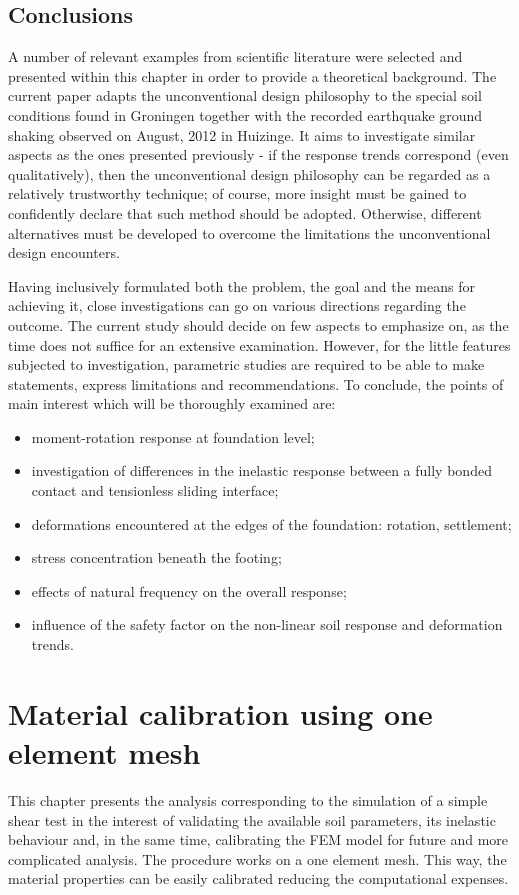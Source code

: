 \documentclass[11pt,a4paper]{report}
\begin{document}
\section{Conclusions}
A number of relevant examples from scientific literature were selected and presented within this chapter in order to provide a theoretical background. The current paper adapts the unconventional design philosophy to the special soil conditions found in Groningen together with the recorded earthquake ground shaking observed on August, 2012 in Huizinge. It aims to investigate similar aspects as the ones presented previously - if the response trends correspond (even qualitatively), then the unconventional design philosophy can be regarded as a relatively trustworthy technique; of course, more insight must be gained to confidently declare that such method should be adopted. Otherwise, different alternatives must be developed to overcome the limitations the unconventional design encounters.

Having inclusively formulated both the problem, the goal and the means for achieving it, close investigations can go on various directions regarding the outcome. The current study should decide on few aspects to emphasize on, as the time does not suffice for an extensive examination. However, for the little features subjected to investigation, parametric studies are required to be able to make statements, express limitations and recommendations. To conclude, the points of main interest which will be thoroughly examined are:
\begin{itemize}
	\item moment-rotation response at foundation level;
	\item investigation of differences in the inelastic response between a fully bonded contact and tensionless sliding interface;
	\item deformations encountered at the edges of the foundation: rotation, settlement;
	\item stress concentration beneath the footing;
	\item effects of natural frequency on the overall response;
	\item influence of the safety factor on the non-linear soil response and deformation trends.
\end{itemize} 

\chapter{Material calibration using one element mesh}\label{ch3}
This chapter presents the analysis corresponding to the simulation of a simple shear test in the interest of validating the available soil parameters, its inelastic behaviour and, in the same time, calibrating the FEM model for future and more complicated analysis. The procedure works on a one element mesh. This way, the material properties can be easily calibrated reducing the computational expenses. 
\end{document}
